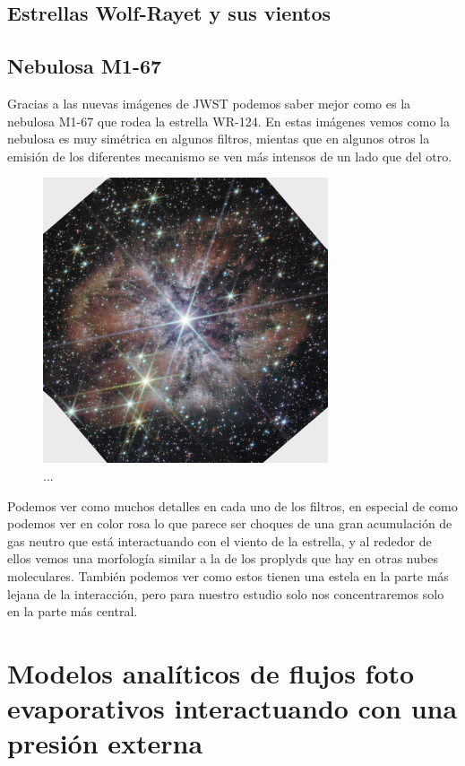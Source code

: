 \documentclass{book}
\begin{document}
\section{Estrellas Wolf-Rayet y sus vientos}

\section{Nebulosa M1-67}

Gracias a las nuevas imágenes de JWST podemos saber mejor como es la nebulosa M1-67 que rodea la estrella WR-124. En estas imágenes vemos como la nebulosa es muy simétrica en algunos filtros, mientas que en algunos otros la emisión de los diferentes mecanismo se ven más intensos de un lado que del otro.

\begin{figure}[h]
    \centering
    \includegraphics[width=0.75\textwidth]{Chp1_m1-67-JWST.jpg}
    \caption{...}
    \label{fig:zones}
\end{figure}

Podemos ver como muchos detalles en cada uno de los filtros, en especial de como podemos ver en color rosa lo que parece ser choques de una gran acumulación de gas neutro que está interactuando con el viento de la estrella, y al rededor de ellos vemos una morfología similar a la de los proplyds que hay en otras nubes moleculares. También podemos ver como estos tienen una estela en la parte más lejana de la interacción, pero para nuestro estudio solo nos concentraremos solo en la parte más central.

\chapter{Modelos analíticos de flujos foto evaporativos interactuando con una presión externa}
\end{document}
